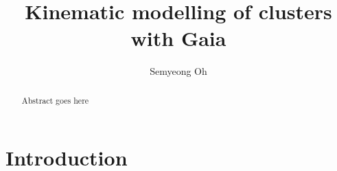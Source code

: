 \documentclass[modern,manuscript]{aastex61}
\begin{document}
\sloppy\sloppypar\raggedbottom\frenchspacing %


\title{ Kinematic modelling of clusters with Gaia }

\author{
  Semyeong Oh
}

\begin{abstract}
  Abstract goes here
\end{abstract}

\section{Introduction}
\label{sec:introduction}




% 
\end{document}

